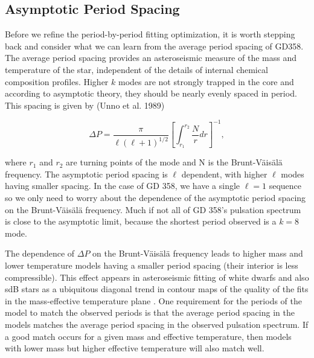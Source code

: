 \documentclass[12pt,preprint]{aastex}
\newcommand{\bvf}{Brunt-V\"ais\"al\"a }
\begin{document}
\subsection{Asymptotic Period Spacing}
\label{periodspacing}

Before we refine the period-by-period fitting optimization, it is worth stepping back and consider 
what we can learn from the average period spacing of GD358. The average period spacing provides an asteroseismic measure of the mass and temperature of the star, independent of the details of 
internal chemical composition profiles. Higher $k$ modes are not strongly trapped in the core and 
according to asymptotic theory, they should be nearly evenly spaced in period. This spacing is 
given by (Unno et al. 1989)

\begin{equation}
\label{fiteq2}
\Delta P = \frac{\pi}{\ell(\ell + 1)^{1/2}}\left[\int_{r_1}^{r_2}\frac{N}{r}dr\right]^{-1},
\end{equation}

\noindent
where $r_1$ and $r_2$ are turning points of the mode and N is the Brunt-V\"{a}is\"{a}l\"{a} frequency. 
The asymptotic period spacing is $\ell$ dependent, with higher $\ell$ modes having smaller spacing. 
In the case of GD 358, we have a single $\ell=1$ sequence so we only need to worry about the dependence 
of the asymptotic period spacing on the \bvf frequency. Much if not all of GD 358's pulsation 
spectrum is close to the asymptotic limit, because the shortest period observed is a $k=8$ mode.

The dependence of $\Delta P$ on the \bvf frequency leads to higher mass and lower temperature models 
having a smaller period spacing (their interior is less compressible). This effect appears in asteroseismic 
fitting of white dwarfs and also sdB stars as a ubiquitous diagonal trend in contour maps of the quality 
of the fits in the mass-effective temperature plane \citep[e.g][]{Bischoff-Kim14,Castanheira09,Charpinet08}. 
One requirement for the periods of the model to match the observed periods is that the average period spacing 
in the models matches the average period spacing in the observed pulsation spectrum. If a good match occurs 
for a given mass and effective temperature, then models with lower mass but higher effective temperature 
will also match well.
\end{document}
